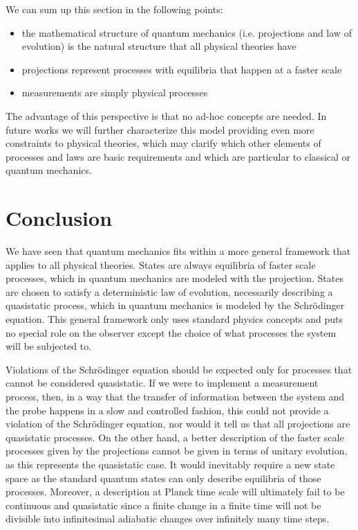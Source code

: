 \documentclass[applsci,article,submit,moreauthors,pdftex]{Definitions/mdpi}
\begin{document}
We can sum up this section in the following points:
\begin{itemize}
	\item the mathematical structure of quantum mechanics (i.e. projections and law of evolution) is the natural structure that all physical theories have
	\item projections represent processes with equilibria that happen at a faster scale 
	\item measurements are simply physical processes
\end{itemize}
The advantage of this perspective is that no ad-hoc concepts are needed. In future works we will further characterize this model providing even more constraints to physical theories, which may clarify which other elements of processes and laws are basic requirements and which are particular to classical or quantum mechanics.

\section{Conclusion}

We have seen that quantum mechanics fits within a more general framework that applies to all physical theories. States are always equilibria of faster scale processes, which in quantum mechanics are modeled with the projection. States are chosen to satisfy a deterministic law of evolution, necessarily describing a quasistatic process, which in quantum mechanics is modeled by the Schr\"{o}dinger equation. This general framework only uses standard physics concepts and puts no special role on the observer except the choice of what processes the system will be subjected to.

Violations of the Schr\"{o}dinger equation should be expected only for processes that cannot be considered quasistatic. If we were to implement a measurement process, then, in a way that the transfer of information between the system and the probe happens in a slow and controlled fashion, this could not provide a violation of the Schr\"{o}dinger equation, nor would it tell us that all projections are quasistatic processes. On the other hand, a better description of the faster scale processes given by the projections cannot be given in terms of unitary evolution, as this represents the quasistatic case. It would inevitably require a new state space as the standard quantum states can only describe equilibria of those processes. Moreover, a description at Planck time scale will ultimately fail to be continuous and quasistatic since a finite change in a finite time will not be divisible into infinitesimal adiabatic changes over infinitely many time steps.
\end{document}
